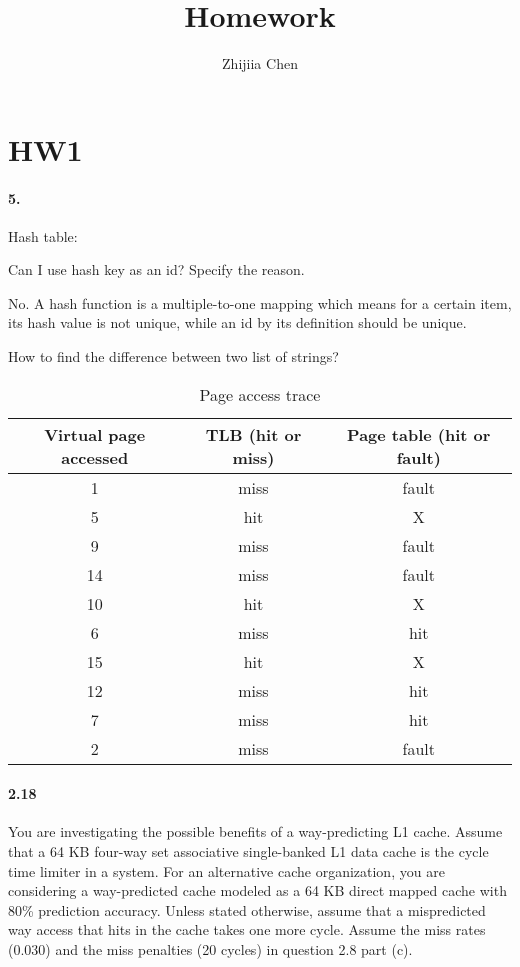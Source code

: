 \documentclass{article}
\title{Homework}
\author{Zhijiia Chen}
\begin{document}
\maketitle

\section{HW1}
\paragraph{5.} Hash table:

Can I use hash key as an id? Specify the reason.

No. A hash function is a multiple-to-one mapping which means for a certain item, its hash value is not unique, while an id by its definition should be unique.

How to find the difference between two list of strings?


\begin{table}[h!]
\begin{center}
    \caption{Page access trace}
    \label{tab:table1}
    \begin{tabular}{c|c|c} %
    \toprule
    \textbf{Virtual page accessed} & \textbf{TLB (hit or miss)} & \textbf{Page table (hit or fault)}\\
    \hline
    1 & miss & fault\\
    \hline
    5 & hit & X\\
    \hline
    9 & miss & fault\\
    \hline
    14 & miss & fault\\
    \hline
    10 & hit & X\\
    \hline
    6 & miss & hit\\
    \hline
    15 & hit & X\\
    \hline
    12 & miss & hit\\
    \hline
    7 & miss & hit\\
    \hline
    2 & miss & fault\\
    \bottomrule
    \end{tabular}
\end{center}
\end{table}

\paragraph{2.18} You are investigating the possible benefits of a way-predicting L1 cache. Assume that a 64 KB four-way set associative single-banked L1 data cache is the cycle time limiter in a system. For an alternative cache organization, you are considering a way-predicted cache modeled as a 64 KB direct mapped cache with 80\% prediction accuracy. Unless stated otherwise, assume that a mispredicted way access that hits in the cache takes one more cycle. Assume the miss rates (0.030) and the miss penalties (20 cycles) in question 2.8 part (c).
\end{document}
